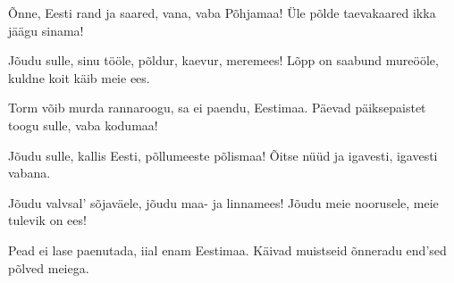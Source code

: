 \~Onne, Eesti rand ja saared,
vana, vaba P\~ohjamaa!
\"Ule p\~olde taevakaared
ikka j\"a\"agu sinama!

J\~oudu sulle, sinu t\"o\"ole,
p\~oldur, kaevur, meremees!
L\~opp on saabund mure\"o\"ole,
kuldne koit k\"aib meie ees.

Torm v\~oib murda rannaroogu,
sa ei paendu, Eestimaa.
P\"aevad p\"aiksepaistet toogu
sulle, vaba kodumaa!

J\~oudu sulle, kallis Eesti,
p\~ollumeeste p\~olismaa!
\~Oitse n\"u\"ud ja igavesti,
igavesti vabana.

J\~oudu valvsal' s\~ojav\"aele,
j\~oudu maa- ja linnamees!
J\~oudu meie noorusele,
meie tulevik on ees!

Pead ei lase paenutada,
iial enam Eestimaa.
K\"aivad muistseid \~onneradu
end'sed p\~olved meiega.